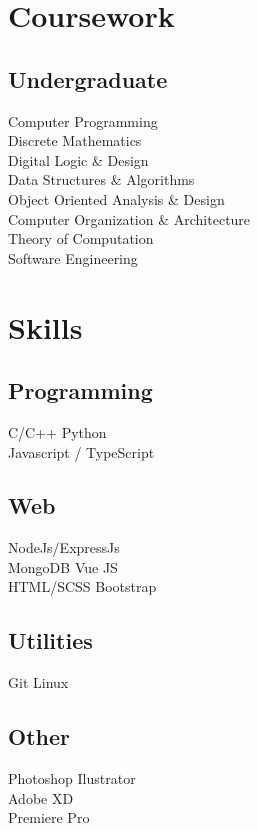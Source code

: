 \documentclass[]{deedy-resume-openfont}
\begin{document}
\begin{minipage}[t]{0.33\textwidth}

\section{Coursework}

\subsection{Undergraduate}
Computer Programming \\
Discrete Mathematics \\
Digital Logic \& Design \\
Data Structures \& Algorithms \\
Object Oriented Analysis \& Design \\
Computer Organization \& Architecture \\
Theory of Computation \\
Software Engineering


\section{Skills}

\subsection{Programming}
\textbullet{} C/C++ \textbullet{} Python \\
\textbullet{} Javascript / TypeScript
\sectionsep

\subsection{Web}
\textbullet{} NodeJs/ExpressJs  \\
\textbullet{} MongoDB
\textbullet{} Vue JS \\
\textbullet{} HTML/SCSS \textbullet{} Bootstrap
\sectionsep

\subsection{Utilities}
\textbullet{} Git \textbullet{} Linux
\sectionsep

\subsection{Other}
\textbullet{} Photoshop \textbullet{} Ilustrator \\
\textbullet{} Adobe XD \\
\textbullet{} Premiere Pro \\
\sectionsep

%
%

\end{minipage} 
\end{document}

